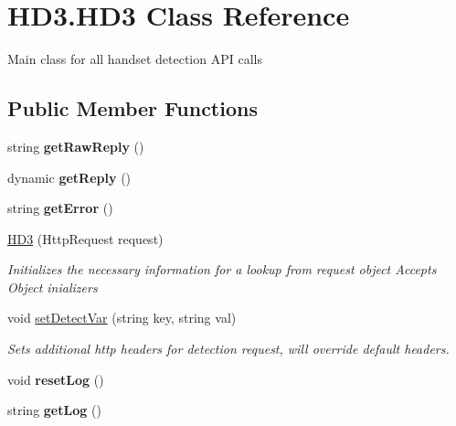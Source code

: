 \hypertarget{class_h_d3_1_1_h_d3}{\section{H\+D3.\+H\+D3 Class Reference}
\label{class_h_d3_1_1_h_d3}
}


Main class for all handset detection A\+P\+I calls  


\subsection*{Public Member Functions}
\begin{DoxyCompactItemize}
\item 
\hypertarget{class_h_d3_1_1_h_d3_a08cdeab81f9bddbfb126a7321ea2fd8c}{string {\bfseries get\+Raw\+Reply} ()}\label{class_h_d3_1_1_h_d3_a08cdeab81f9bddbfb126a7321ea2fd8c}

\item 
\hypertarget{class_h_d3_1_1_h_d3_ad79fcc6a7b1e5d38abc7219af87b3a2f}{dynamic {\bfseries get\+Reply} ()}\label{class_h_d3_1_1_h_d3_ad79fcc6a7b1e5d38abc7219af87b3a2f}

\item 
\hypertarget{class_h_d3_1_1_h_d3_a3dc243815bb91775b05d6fb148959983}{string {\bfseries get\+Error} ()}\label{class_h_d3_1_1_h_d3_a3dc243815bb91775b05d6fb148959983}

\item 
\hyperlink{class_h_d3_1_1_h_d3_a0a238bb9c0e43132312e5c863292c577}{H\+D3} (Http\+Request request)
\begin{DoxyCompactList}\small\item\em Initializes the necessary information for a lookup from request object Accepts Object inializers \end{DoxyCompactList}\item 
void \hyperlink{class_h_d3_1_1_h_d3_a658104a63e4bac0a909cdcfed8c2d49b}{set\+Detect\+Var} (string key, string val)
\begin{DoxyCompactList}\small\item\em Sets additional http headers for detection request, will override default headers.\end{DoxyCompactList}\item 
\hypertarget{class_h_d3_1_1_h_d3_a92e1a5bec8573497497bb7e4082a6b5c}{void {\bfseries reset\+Log} ()}\label{class_h_d3_1_1_h_d3_a92e1a5bec8573497497bb7e4082a6b5c}

\item 
\hypertarget{class_h_d3_1_1_h_d3_a2436e33681884291c6ad1b2ee112e17b}{string {\bfseries get\+Log} ()}\label{class_h_d3_1_1_h_d3_a2436e33681884291c6ad1b2ee112e17b}


\end{DoxyCompactItemize}
